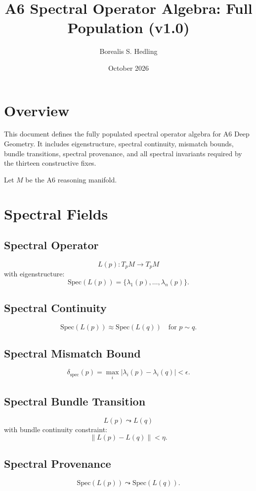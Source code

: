 \documentclass[11pt]{article}
\title{A6 Spectral Operator Algebra: Full Population (v1.0)}
\author{Borealis S. Hedling}
\date{October 2026}
\begin{document}
\maketitle

\section*{Overview}

This document defines the fully populated spectral operator algebra for A6 Deep
Geometry. It includes eigenstructure, spectral continuity, mismatch bounds,
bundle transitions, spectral provenance, and all spectral invariants required by
the thirteen constructive fixes.

Let $M$ be the A6 reasoning manifold.

\section{Spectral Fields}

\subsection{Spectral Operator}
\[
L(p) : T_pM \to T_pM
\]
with eigenstructure:
\[
\mathrm{Spec}(L(p)) = \{\lambda_1(p), \ldots, \lambda_n(p)\}.
\]

\subsection{Spectral Continuity}
\[
\mathrm{Spec}(L(p)) \approx \mathrm{Spec}(L(q)) \quad \text{for } p \sim q.
\]

\subsection{Spectral Mismatch Bound}
\[
\delta_{\mathrm{spec}}(p) = 
  \max_i |\lambda_i(p) - \lambda_i(q)| < \epsilon.
\]

\subsection{Spectral Bundle Transition}
\[
L(p) \leadsto L(q)
\]
with bundle continuity constraint:
\[
\|L(p) - L(q)\| < \eta.
\]

\subsection{Spectral Provenance}
\[
\mathrm{Spec}(L(p)) \leadsto \mathrm{Spec}(L(q)).
\]
\end{document}
